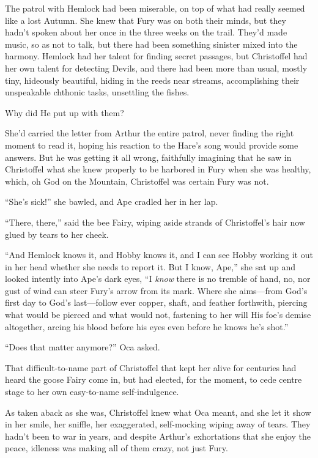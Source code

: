 \documentclass[11pt,a5paper]{article}
\begin{document}
The patrol with Hemlock had been miserable, on top of what had really seemed like a lost Autumn. She knew that Fury was on both their minds, but they hadn't spoken about her once in the three weeks on the trail. They'd made music, so as not to talk, but there had been something sinister mixed into the harmony. Hemlock had her talent for finding secret passages, but Christoffel had her own talent for detecting Devils, and there had been more than usual, mostly tiny, hideously beautiful, hiding in the reeds near streams, accomplishing their unspeakable chthonic tasks, unsettling the fishes.

Why did He put up with them?

She'd carried the letter from Arthur the entire patrol, never finding the right moment to read it, hoping his reaction to the Hare's song would provide some answers. But he was getting it all wrong, faithfully imagining that he saw in Christoffel what she knew properly to be harbored in Fury when she was healthy, which, oh God on the Mountain, Christoffel was certain Fury was not.

``She's sick!'' she bawled, and Ape cradled her in her lap.

``There, there,'' said the bee Fairy, wiping aside strands of Christoffel's hair now glued by tears to her cheek.

``And Hemlock knows it, and Hobby knows it, and I can see Hobby working it out in her head whether she needs to report it. But I know, Ape,'' she sat up and looked intently into Ape's dark eyes, ``I \emph{know} there is no tremble of hand, no, nor gust of wind can steer Fury's arrow from its mark. Where she aims---from God's first day to God's last---follow ever copper, shaft, and feather forthwith, piercing what would be pierced and what would not, fastening to her will His foe's demise altogether, arcing his blood before his eyes even before he knows he's shot.''

``Does that matter anymore?'' Oca asked.

That difficult-to-name part of Christoffel that kept her alive for centuries had heard the goose Fairy come in, but had elected, for the moment, to cede centre stage to her own easy-to-name self-indulgence.

As taken aback as she was, Christoffel knew what Oca meant, and she let it show in her smile, her sniffle, her exaggerated, self-mocking wiping away of tears. They hadn't been to war in years, and despite Arthur's exhortations that she enjoy the peace, idleness was making all of them crazy, not just Fury.
\end{document}
